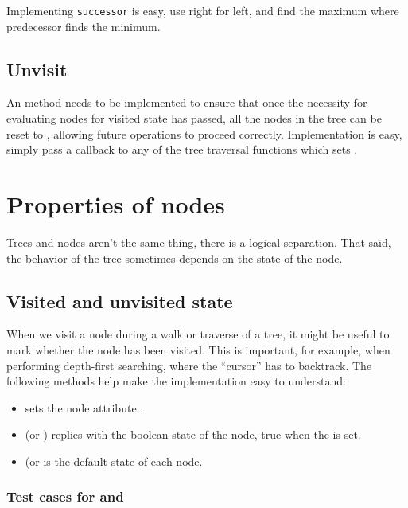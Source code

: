 \documentclass{article}
\begin{document}
\sno Implementing {\tt successor} is easy, use right for left, and find the
maximum where predecessor finds the minimum.

\subsection{Unvisit}

An  method needs to be implemented to ensure that once the
necessity for evaluating nodes for visited state has passed, all
the nodes in the tree can be reset to , allowing
future operations to proceed correctly. Implementation is easy,
simply pass a callback to any of the tree traversal functions which
sets .


\section{Properties of nodes}

Trees and nodes aren't the same thing, there is a logical separation.
That said, the behavior of the tree sometimes depends on the state of the
node.

\subsection{Visited and unvisited state}

When we visit a node during a walk or traverse of a tree, it might be
useful to mark whether the node has been visited. This is important, for
example, when performing depth-first searching, where the ``cursor'' has
to backtrack. The following methods help make the implementation easy
to understand:

\begin{itemize}
  \item {} sets the node attribute .
  \item {} (or ) replies with the boolean
    state of the node, true when the  is set.
  \item {} (or  is the default state
      of each node.
\end{itemize}

\subsubsection{Test cases for  and }
\end{document}
